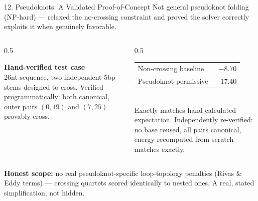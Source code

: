 \documentclass[aspectratio=169,10pt]{beamer}
\begin{document}
\begin{frame}{12. Pseudoknots: A Validated Proof-of-Concept}
  \small Not general pseudoknot folding (NP-hard) --- relaxed the no-crossing constraint and proved the solver correctly exploits it when genuinely favorable.
  \vspace{6pt}
  \begin{columns}[T]
    \begin{column}{0.5\textwidth}
      \begin{cardbox}
      \textbf{\color{navy}\footnotesize Hand-verified test case}\\[4pt]
      \tiny 26nt sequence, two independent 5bp stems designed to cross. Verified programmatically: both canonical, outer pairs $(0,19)$ and $(7,25)$ provably cross.
      \end{cardbox}
    \end{column}
    \begin{column}{0.5\textwidth}
      \begin{cardbox}
      \small
      \begin{tabular}{@{}lr@{}}
        Non-crossing baseline & $-8.70$ \\
        Pseudoknot-permissive & \textbf{$-17.40$} \\
      \end{tabular}\\[4pt]
      \tiny Exactly matches hand-calculated expectation. Independently re-verified: no base reused, all pairs canonical, energy recomputed from scratch matches exactly.
      \end{cardbox}
    \end{column}
  \end{columns}
  \vspace{8pt}
  \begin{navybox}
  \footnotesize \textbf{Honest scope:} no real pseudoknot-specific loop-topology penalties (Rivas \& Eddy terms) --- crossing quartets scored identically to nested ones. A real, stated simplification, not hidden.
  \end{navybox}
\end{frame}
\end{document}

